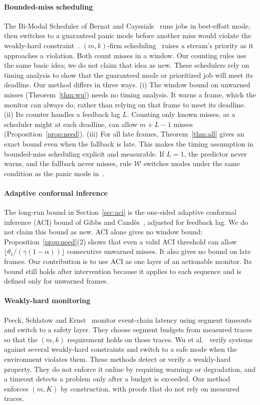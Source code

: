 \documentclass[acmsmall,screen]{acmart}
\newcommand{\Wl}{$\mathcal{W}$}
\begin{document}
\paragraph{Bounded-miss scheduling} The Bi-Modal Scheduler of Bernat and Cayssials~\cite{bernat2001bms} runs jobs in best-effort mode, then switches to a guaranteed panic mode before another miss would violate the weakly-hard constraint~\cite{bernat2001weakly}. $(m,k)$-firm scheduling~\cite{hamdaoui1995} raises a stream's priority as it approaches a violation. Both count misses in a window. Our counting rules use the same basic idea; we do not claim that idea as new. These schedulers rely on timing analysis to show that the guaranteed mode or prioritized job will meet its deadline. Our method differs in three ways. (i) The window bound on unwarned misses (Theorem~\ref{thm:wu}) needs no timing analysis. It warns a frame, which the monitor can always do, rather than relying on that frame to meet its deadline. (ii) Its counter handles a feedback lag $L$. Counting only known misses, as a scheduler might at each deadline, can allow $m+L-1$ misses (Proposition~\ref{prop:need}). (iii) For all late frames, Theorem~\ref{thm:all} gives an exact bound even when the fallback is late. This makes the timing assumption in bounded-miss scheduling explicit and measurable. If $L=1$, the predictor never warns, and the fallback never misses, rule \Wl{} switches modes under the same condition as the panic mode in~\cite{bernat2001bms}.

\paragraph{Adaptive conformal inference} The long-run bound in Section~\ref{sec:aci} is the one-sided adaptive conformal inference (ACI) bound of Gibbs and Cand\`es~\cite{gibbs2021}, adjusted for feedback lag. We do not claim this bound as new. ACI alone gives no window bound: Proposition~\ref{prop:need}(2) shows that even a valid ACI threshold can allow $\lfloor\theta_1/(\gamma(1-\alpha))\rfloor$ consecutive unwarned misses. It also gives no bound on late frames. Our contribution is to use ACI as one layer of an actionable monitor. Its bound still holds after intervention because it applies to each sequence and is defined only for unwarned frames.

\paragraph{Weakly-hard monitoring} Peeck, Schlatow and Ernst~\cite{peeck2021} monitor event-chain latency using segment timeouts and switch to a safety layer. They choose segment budgets from measured traces so that the $(m,k)$ requirement holds on those traces. Wu et al.~\cite{wu2020rv} verify systems against several weakly-hard constraints and switch to a safe mode when the environment violates them. These methods detect or verify a weakly-hard property. They do not enforce it online by requiring warnings or degradation, and a timeout detects a problem only after a budget is exceeded. Our method enforces $(m,K)$ by construction, with proofs that do not rely on measured traces.
\end{document}
